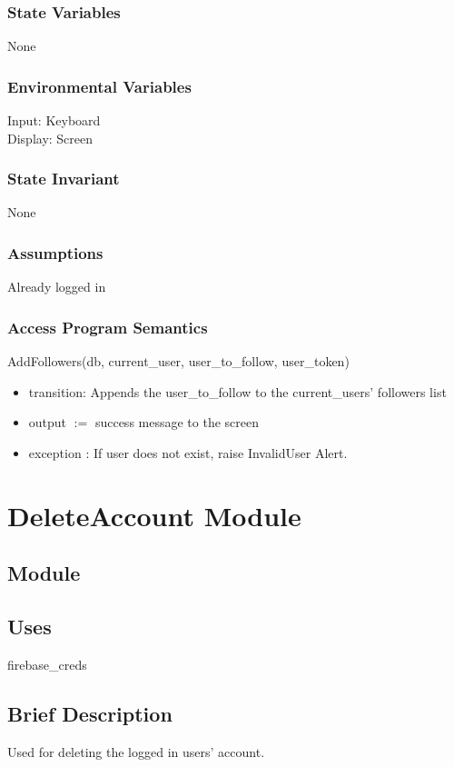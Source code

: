 \documentclass[12pt, titlepage]{article}
\begin{document}
\subsubsection{State Variables}
None

\subsubsection{Environmental Variables}
Input: Keyboard\\
Display: Screen

\subsubsection{State Invariant}
None

\subsubsection{Assumptions}
Already logged in

\subsubsection{Access Program Semantics}
AddFollowers(db, current\_user, user\_to\_follow, user\_token)
\begin{itemize}
    \item transition: Appends the user\_to\_follow to the current\_users' followers list
    \item output $:= $ success message to the screen
    \item exception : If user does not exist, raise InvalidUser Alert.
\end{itemize}





\newpage
\section* {DeleteAccount Module}

\subsection*{Module}

\subsection* {Uses}
firebase\_creds

\subsection* {Brief Description}
Used for deleting the logged in users' account.
\end{document}

